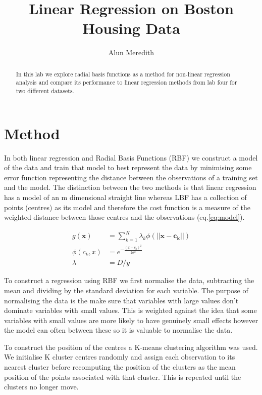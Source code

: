 \documentclass[a4paper,11pt, twocolumn]{article}
\begin{document}
\title{Linear Regression on Boston Housing Data}
\author{Alun Meredith}
\maketitle

\begin{abstract}
In this lab we explore radial basis functions as a method for non-linear regression analysis and compare its performance to linear regression methods from lab four for two different datasets.
\end{abstract}

\section{Method}
In both linear regression and Radial Basis Functions (RBF) we construct a model of the data and train that model to best represent the data by minimising some error function representing the distance between the observations of a training set and the model. The distinction between the two methods is that linear regression has a model of an m dimensional straight line whereas LBF has a collection of points (centres) as its model and therefore the cost function is a measure of the weighted distance between those centres and the observations (eq.\ref{eq:model}).

\begin{align}
	\label{eq:model}	
	g(\mathbf{x}) &= \sum_{k=1}^K\lambda_k\phi(||\mathbf{x-c_k}||)\\
	\label{eq:pdf}
	\phi(c_k,x) &= e^{{-\frac{(x-c_k)^2}{2\sigma^2}}}\\
	\label{eq:weights}
	\lambda &= D / y
\end{align} 

To construct a regression using RBF we first normalise the data, subtracting the mean and dividing by the standard deviation for each variable. The purpose of normalising the data is the make sure that variables with large values don't dominate variables with small values. This is weighted against the idea that some variables with small values are more likely to have genuinely small effects however the model can often between these so it is valuable to normalise the data. 

To construct the position of the centres a K-means clustering algorithm was used. We initialise K cluster centres randomly and assign each observation to its nearest cluster before recomputing the position of the clusters as the mean position of the points associated with that cluster. This is repeated until the clusters no longer move. 
\end{document}
